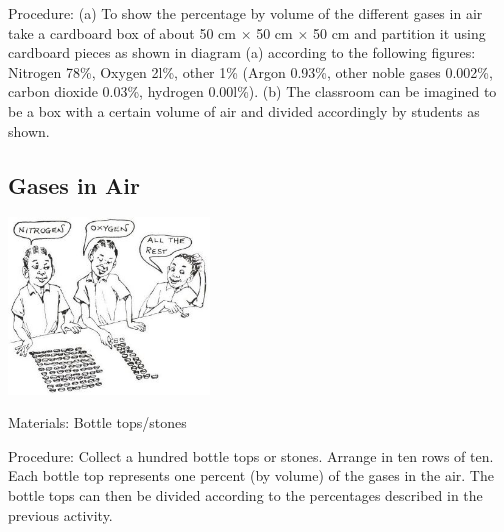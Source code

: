 \begin{multicols}{2}
\begin{description*}
\item[Procedure:]{(a) To show the percentage by volume of
the different gases in air take a cardboard box of
about 50 cm $\times$ 50 cm $\times$ 50 cm and partition it
using cardboard pieces as shown in diagram (a)
according to the following figures: Nitrogen
78\%, Oxygen 2l\%, other 1\% (Argon 0.93\%,
other noble gases 0.002\%, carbon dioxide 0.03\%,
hydrogen 0.00l\%).
(b) The classroom can be imagined to be a box
with a certain volume of air and divided
accordingly by students as shown.}
\end{description*}

\subsection{Gases in Air}

\begin{center}
\includegraphics[width=0.4\textwidth]{./img/source/gases-in-air.jpg}
\end{center}

\begin{description*}
\item[Materials:]{Bottle tops/stones}
\item[Procedure:]{Collect a hundred bottle tops or
stones. Arrange in ten rows of ten. Each bottle
top represents one percent (by volume) of the
gases in the air. The bottle tops can then be
divided according to the percentages described
in the previous activity.}
\end{description*}


\end{multicols}
